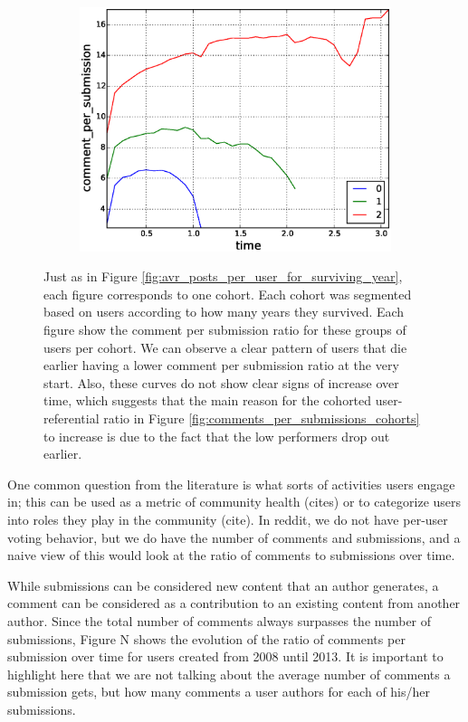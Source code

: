 \begin{figure}[!tb]
\begin{subfigure}{.3\textwidth}\includegraphics[scale=0.285]{./images/comments_per_submissions_for_surviving_year_for_2012.eps}\caption{}\end{subfigure}
\caption{Just as in Figure \ref{fig:avr_posts_per_user_for_surviving_year}, each figure corresponds to one cohort. Each cohort was segmented based on users according to how many years they survived. Each figure show the comment per submission ratio for these groups of users per cohort. We can observe a clear pattern of users that die earlier having a lower comment per submission ratio at the very start. Also, these curves do not show clear signs of increase over time, which suggests that the main reason for the cohorted user-referential ratio in Figure \ref{fig:comments_per_submissions_cohorts} to increase is due to the fact that the low performers drop out earlier.}
\label{fig:comments_per_submissions_for_surviving_year}
\end{figure}

One common question from the literature is what sorts of activities users engage in; this can be used as a metric of community health (cites) or to categorize users into roles they play in the community (cite).  In reddit, we do not have per-user voting behavior, but we do have the number of comments and submissions, and a naive view of this would look at the ratio of comments to submissions over time.

While submissions can be considered new content that an author generates, a comment can be considered as a contribution to an existing content from another author. Since the total number of comments always surpasses the number of submissions, Figure N shows the evolution of the ratio of comments per submission over time for users created from 2008 until 2013. It is important to highlight here that we are not talking about the average number of comments a submission gets, but how many comments a user authors for each of his/her submissions.

